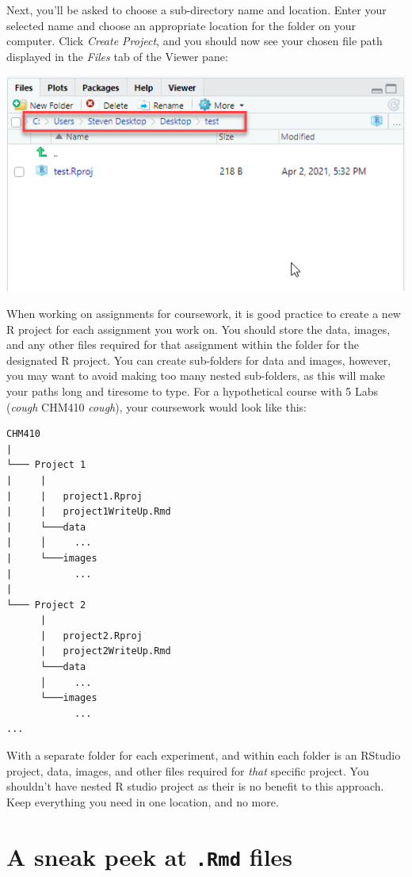 \documentclass[
]{book}
\begin{document}
Next, you'll be asked to choose a sub-directory name and location. Enter your selected name and choose an appropriate location for the folder on your computer. Click \emph{Create Project}, and you should now see your chosen file path displayed in the \emph{Files} tab of the Viewer pane:

\includegraphics{images/Rstudio_Rproj.png}

When working on assignments for coursework, it is good practice to create a new R project for each assignment you work on. You should store the data, images, and any other files required for that assignment within the folder for the designated R project. You can create sub-folders for data and images, however, you may want to avoid making too many nested sub-folders, as this will make your paths long and tiresome to type. For a hypothetical course with 5 Labs (\emph{cough} CHM410 \emph{cough}), your coursework would look like this:

\begin{verbatim}
CHM410
|
└─── Project 1
|     |
|     |   project1.Rproj
|     |   project1WriteUp.Rmd
|     └───data
|     │     ...
|     └───images
|           ...
|
└─── Project 2
      |
      |   project2.Rproj
      |   project2WriteUp.Rmd
      └───data
      │     ...
      └───images
            ...
...
\end{verbatim}

With a separate folder for each experiment, and within each folder is an RStudio project, data, images, and other files required for \emph{that} specific project. You shouldn't have nested R studio project as their is no benefit to this approach. Keep everything you need in one location, and no more.

\hypertarget{a-sneak-peek-at-.rmd-files}{%
\section{\texorpdfstring{A sneak peek at \texttt{.Rmd} files}{A sneak peek at .Rmd files}}\label{a-sneak-peek-at-.rmd-files}}
\end{document}
